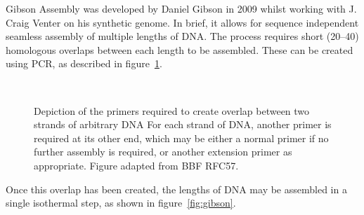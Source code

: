 \documentclass[../main.tex]{subfiles}
\begin{document}
Gibson Assembly was developed by Daniel Gibson\cite{gibson09} in 2009 whilst working with J. Craig Venter on his synthetic genome\cite{venter10}. In brief, it allows for sequence independent seamless assembly of multiple lengths of DNA. The process requires short (\SIrange{20}{40}{\base}) homologous overlaps between each length to be assembled. These can be created using PCR, as described in figure~\ref{fig:gibsonPCR}.
\begin{figure}[p]
\\
\caption{Depiction of the primers required to create overlap between two strands of arbitrary DNA For each strand of DNA, another primer is required at its other end, which may be either a normal primer if no further assembly is required, or another extension primer as appropriate. Figure adapted from BBF RFC57\cite{rfc57}.}
\label{fig:gibsonPCR}
\end{figure}

Once this overlap has been created, the lengths of DNA may be assembled in a single isothermal step, as shown in figure~\ref{fig:gibson}. 
\end{document}
